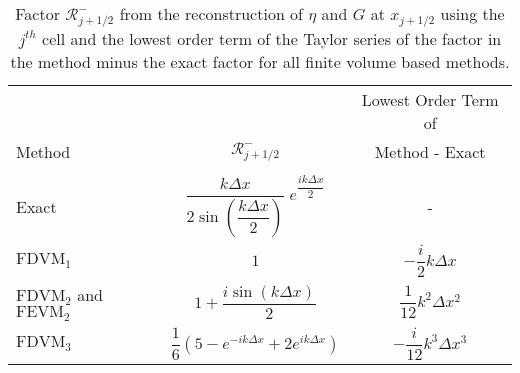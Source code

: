 \begin{table}
	\centering
	\begin{tabular}{l  c  c}
		&&Lowest Order Term of	\\
		Method& $\mathcal{R}^-_{j+1/2}$ &  Method - Exact\B \\
		\hline \\
		Exact & $ \dfrac{k\Delta x}{2 \sin\left(\dfrac{k \Delta x}{2}\right)} \; e^{\dfrac{ik\Delta x}{2}}$ & - \T\B \\
		$\text{FDVM}_1$& $1$ & $-\dfrac{i}{2}k \Delta x$  \T\B \\
		$\text{FDVM}_2$ and $\text{FEVM}_2$& $1 +  \dfrac{i \sin\left(k\Delta x \right)}{2}$ & $\dfrac{1}{12}k^2 \Delta x^2$  \T\B \\
		$\text{FDVM}_3$& $\dfrac{1}{6}\left({5 - e^{-i k {\Delta x}} +2 e^{i k {\Delta x}}} \right)$ & $-\dfrac{i}{12}k^3 \Delta x^3$  \T\B \\
		\hline
	\end{tabular}
	\caption{Factor $\mathcal{R}^-_{j+1/2}$ from the reconstruction of $\eta$ and $G$ at $x_{j+1/2}$ using the ${j^{th}}$ cell and the lowest order term of the Taylor series of the factor in the method minus the exact factor for all finite volume based methods.}
	\label{tab:Rmfactor}
\end{table}
